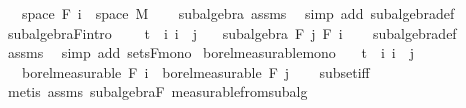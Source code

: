 \begin{isabellebody}
\ \ \ {\isachardoublequoteopen}space\ {\isacharparenleft}{\kern0pt}F\ i{\isacharparenright}{\kern0pt}\ {\isacharequal}{\kern0pt}\ space\ M{\isachardoublequoteclose}\isanewline
%
\isadelimproof
\ \ %
\endisadelimproof
%
\isatagproof
{}\isamarkupfalse%
\ subalgebra\ assms\ \isamarkupfalse%
\ {\isacharparenleft}{\kern0pt}simp\ add{\isacharcolon}{\kern0pt}\ subalgebra{\isacharunderscore}{\kern0pt}def{\isacharparenright}{\kern0pt}%
\endisatagproof
{\isafoldproof}%
%
\isadelimproof
\isanewline
%
\endisadelimproof
\isanewline
{}\isamarkupfalse%
\ subalgebra{\isacharunderscore}{\kern0pt}F{\isacharbrackleft}{\kern0pt}intro{\isacharbrackright}{\kern0pt}{\isacharcolon}{\kern0pt}\ \isanewline
\ \ \ {\isachardoublequoteopen}t\ {\isasymle}\ i{\isachardoublequoteclose}\ {\isachardoublequoteopen}i\ {\isasymle}\ j{\isachardoublequoteclose}\isanewline
\ \ \ {\isachardoublequoteopen}subalgebra\ {\isacharparenleft}{\kern0pt}F\ j{\isacharparenright}{\kern0pt}\ {\isacharparenleft}{\kern0pt}F\ i{\isacharparenright}{\kern0pt}{\isachardoublequoteclose}\isanewline
%
\isadelimproof
\ \ %
\endisadelimproof
%
\isatagproof
{}\isamarkupfalse%
\ subalgebra{\isacharunderscore}{\kern0pt}def\ \isamarkupfalse%
\ assms\ \isamarkupfalse%
\ {\isacharparenleft}{\kern0pt}simp\ add{\isacharcolon}{\kern0pt}\ sets{\isacharunderscore}{\kern0pt}F{\isacharunderscore}{\kern0pt}mono{\isacharparenright}{\kern0pt}%
\endisatagproof
{\isafoldproof}%
%
\isadelimproof
\isanewline
%
\endisadelimproof
\isanewline
{}\isamarkupfalse%
\ borel{\isacharunderscore}{\kern0pt}measurable{\isacharunderscore}{\kern0pt}mono{\isacharcolon}{\kern0pt}\isanewline
\ \ \ {\isachardoublequoteopen}t\ {\isasymle}\ i{\isachardoublequoteclose}\ {\isachardoublequoteopen}i\ {\isasymle}\ j{\isachardoublequoteclose}\isanewline
\ \ \ {\isachardoublequoteopen}borel{\isacharunderscore}{\kern0pt}measurable\ {\isacharparenleft}{\kern0pt}F\ i{\isacharparenright}{\kern0pt}\ {\isasymsubseteq}\ borel{\isacharunderscore}{\kern0pt}measurable\ {\isacharparenleft}{\kern0pt}F\ j{\isacharparenright}{\kern0pt}{\isachardoublequoteclose}\isanewline
%
\isadelimproof
\ \ %
\endisadelimproof
%
\isatagproof
{}\isamarkupfalse%
\ subset{\isacharunderscore}{\kern0pt}iff\ \isamarkupfalse%
\ {\isacharparenleft}{\kern0pt}metis\ assms\ subalgebra{\isacharunderscore}{\kern0pt}F\ measurable{\isacharunderscore}{\kern0pt}from{\isacharunderscore}{\kern0pt}subalg{\isacharparenright}{\kern0pt}%

\end{isabellebody}

